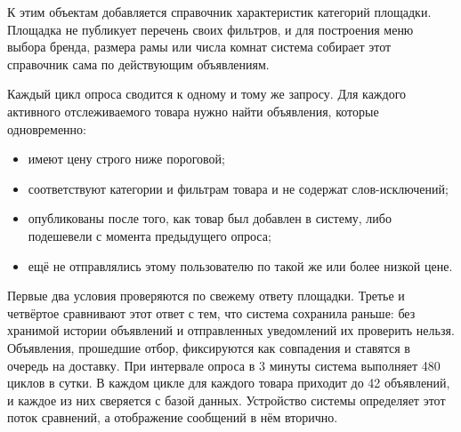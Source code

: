 К этим объектам добавляется справочник характеристик категорий площадки. Площадка не публикует перечень своих фильтров, и для построения меню выбора бренда, размера рамы или числа комнат система собирает этот справочник сама по действующим объявлениям.

Каждый цикл опроса сводится к одному и тому же запросу. Для каждого активного отслеживаемого товара нужно найти объявления, которые одновременно:
\begin{itemize}
	\item имеют цену строго ниже пороговой;
	\item соответствуют категории и фильтрам товара и не содержат слов-исключений;
	\item опубликованы после того, как товар был добавлен в систему, либо подешевели с момента предыдущего опроса;
	\item ещё не отправлялись этому пользователю по такой же или более низкой цене.
\end{itemize}

Первые два условия проверяются по свежему ответу площадки. Третье и четвёртое сравнивают этот ответ с тем, что система сохранила раньше: без хранимой истории объявлений и отправленных уведомлений их проверить нельзя. Объявления, прошедшие отбор, фиксируются как совпадения и ставятся в очередь на доставку. При интервале опроса в 3 минуты система выполняет 480 циклов в сутки. В каждом цикле для каждого товара приходит до 42 объявлений, и каждое из них сверяется с базой данных. Устройство системы определяет этот поток сравнений, а отображение сообщений в нём вторично.
